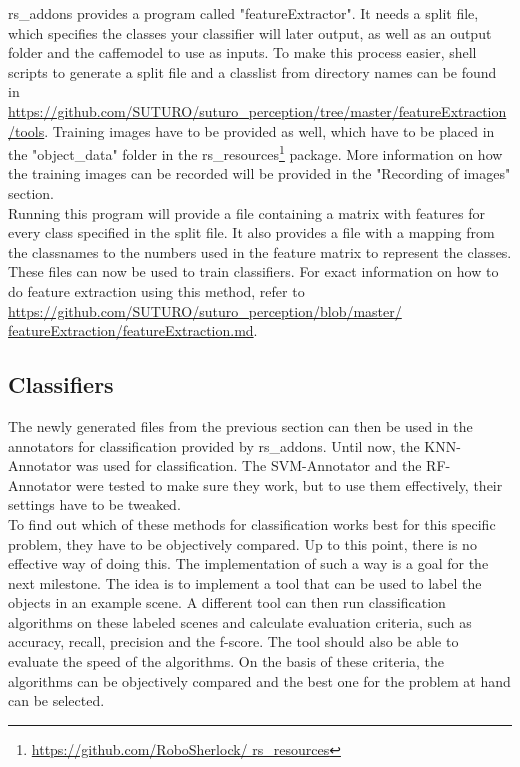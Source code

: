 \documentclass[main.tex]{subfiles}
\begin{document}
		    rs\_addons provides a program called "featureExtractor". It needs a split file, which specifies the classes your classifier will later output, as well 				as an output folder and the caffemodel to use as inputs. To make this process easier, shell scripts to generate a split file and a classlist from 					directory names can be found in \url{https://github.com/SUTURO/suturo_perception/tree/master/featureExtraction/tools}. Training images have to be 					provided as well, which have to be placed in the "object\_data" folder in the rs\_resources\footnote{\url{https://github.com/RoboSherlock/							rs_resources}} package. More information on how the training images can be recorded will be provided in the "Recording of images" section.\\

		     Running this program will provide a file containing a matrix with features for every class specified in the split file. It also provides a file with a 			mapping from the classnames to the numbers used in the feature matrix to represent the classes. These files can now be used to train classifiers. For 				exact information on how to do feature extraction using this method, refer to \url{https://github.com/SUTURO/suturo_perception/blob/master/							featureExtraction/featureExtraction.md}.

			\subsection{Classifiers}
			The newly generated files from the previous section can then be used in the annotators for classification provided by rs\_addons. Until now, the KNN-					Annotator was used for classification. The SVM-Annotator and the RF-Annotator were tested to make sure they work, but to use them effectively, their 					settings have to be tweaked.\\

			To find out which of these methods for classification works best for this specific problem, they have to be objectively compared. Up to this point, 					there is no effective way of doing this. The implementation of such a way is a goal for the next milestone. The idea is to implement a tool that 						can be used to label the objects in an example scene. A different tool can then run classification algorithms on these labeled scenes and calculate 					evaluation criteria, such as accuracy, recall, precision and the f-score. The tool should also be able to evaluate the speed of the algorithms. On the 				basis of these criteria, the algorithms can be objectively compared and the best one for the problem at hand can be selected.
\end{document}
